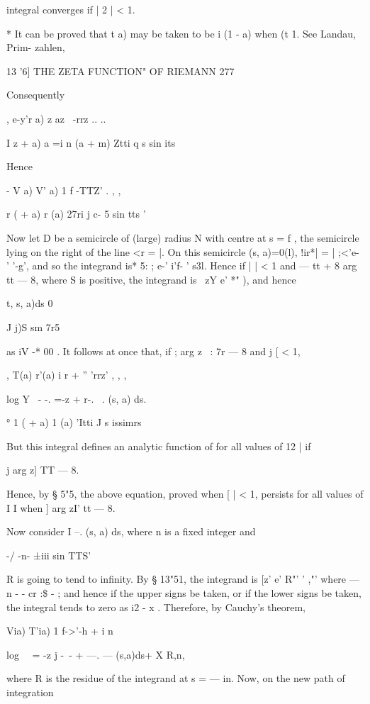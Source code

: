 {{integral converges if | 2 | < 1.

* It can be proved that t a) may be taken to be i (1 - a) when (t 1.
See Landau, Prim- zahlen, %



13 '6] THE ZETA FUNCTION" OF RIEMANN 277

Consequently

, e-y'r a) z az \ -rrz .. ..

I z + a) a =i n (a + m) Ztti q s sin its

Hence

- V a) V' a) 1 f -TTZ' . , ,

  r ( + a) r (a) 27ri j c- 5 sin tts '

Now let D be a semicircle of (large) radius N with centre at s = f ,
the semicircle lying on the right of the line <r = |. On this
semicircle (s, a)=0(l), !ir*| = | ;<'e- ' '-g', and so the integrand
is* 5: ; e-' i'f- ' s3l. Hence if | | < 1 and — tt + 8 arg tt — 8,
where S is positive, the integrand is \ zY e' *" ), and hence

t, s, a)ds 0



J j)S sm 7r5

as iV -* 00 . It follows at once that, if ; arg z \ : 7r — 8 and j [ <
1,

, T(a) r'(a) i r + '' 'rrz' , , ,

log Y ~- -. =-z + r-. ~. (s, a) ds.

° 1 ( + a) 1 (a) 'Itti J s issimrs

But this integral defines an analytic function of for all values of 12
| if

j arg z] TT — 8.

Hence, by § 5"5, the above equation, proved when [ | < 1, persists for
all values of I I when ] arg zI' tt — 8.

Now consider I --. (s, a) ds, where n is a fixed integer and

-/ -n- ±iii sin TTS'

R is going to tend to infinity. By § 13"51, the integrand is [z' e'
R"' ' ,"' where — n - - cr :\$ - ; and hence if the upper signs be
taken, or if the lower signs be taken, the integral tends to zero as
i2 - x . Therefore, by Cauchy's theorem,

Via) T'ia) 1 f->'-h + i n

log \ \ = -z j -~- + —. — (s,a)ds+ X R,n,

where R is the residue of the integrand at s = — in. Now, on the new
path of integration

}}
